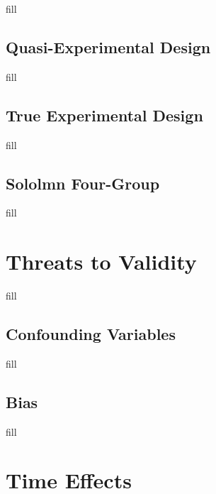 \documentclass[
  b5paper]{book}
\begin{document}
fill

\hypertarget{quasi-experimental-design}{%
\subsection*{Quasi-Experimental Design}\label{quasi-experimental-design}}

fill

\hypertarget{true-experimental-design}{%
\subsection*{True Experimental Design}\label{true-experimental-design}}

fill

\hypertarget{sololmn-four-group}{%
\subsection*{Sololmn Four-Group}\label{sololmn-four-group}}

fill

\hypertarget{threats-to-validity}{%
\section{Threats to Validity}\label{threats-to-validity}}

fill

\hypertarget{confounding-variables}{%
\subsection*{Confounding Variables}\label{confounding-variables}}

fill

\hypertarget{bias}{%
\subsection*{Bias}\label{bias}}

fill

\hypertarget{time-effects}{%
\section{Time Effects}\label{time-effects}}
\end{document}
